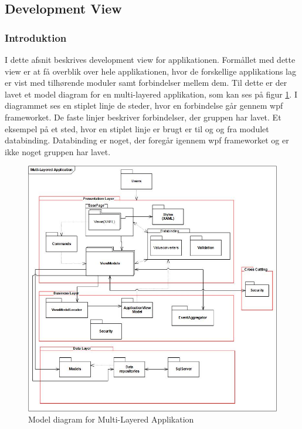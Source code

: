\documentclass[Arkitektur/System_main.tex]{subfiles}
\begin{document}
\subsection{Development View}
\subsubsection{Introduktion}
I dette afsnit beskrives development view for applikationen. Formållet med dette view er at få overblik over hele applikationen, hvor de forskellige applikations lag er vist med tilhørende moduler samt forbindelser mellem dem. Til dette er der lavet et model diagram for en multi-layered applikation, som kan ses på figur \ref{fig:PackageDiagram}. I diagrammet ses en stiplet linje de steder, hvor en forbindelse går gennem wpf frameworket. De faste linjer beskriver forbindelser, der gruppen har lavet. Et eksempel på et sted, hvor en stiplet linje er brugt er til og og fra modulet databinding. Databinding er noget, der foregår igennem wpf frameworket og er ikke noget gruppen har lavet.

\begin{figure}[H]
    \centering
    \includegraphics[width=\textwidth]{Arkitektur/4+1View/Graphics/PackageDiagram.jpg}
    \caption{Model diagram for Multi-Layered Applikation}
    \label{fig:PackageDiagram}
\end{figure}
\end{document}
